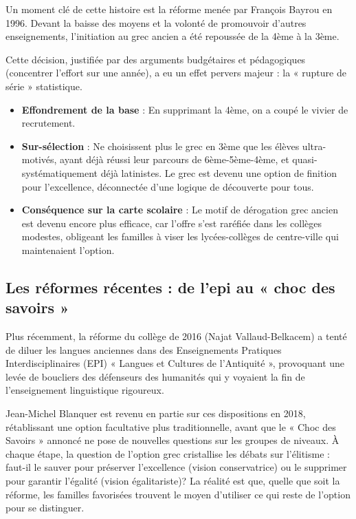 Un moment clé de cette histoire est la réforme menée par François Bayrou en 1996. Devant la baisse
des moyens et la volonté de promouvoir d'autres enseignements, l'initiation au grec ancien a été
repoussée de la 4ème à la 3ème.\cite{I-3-1-ref40}

Cette décision, justifiée par des arguments budgétaires et pédagogiques (concentrer l'effort sur une
année), a eu un effet pervers majeur : la « rupture de série » statistique.

\begin{itemize}\item \textbf{Effondrement de la base} : En supprimant la 4ème, on a coupé le vivier de recrutement.\item \textbf{Sur-sélection} : Ne choisissent plus le grec en 3ème que les élèves ultra-motivés, ayant déjà réussi leur parcours de 6ème-5ème-4ème, et quasi-systématiquement déjà latinistes. Le grec est devenu une option de finition pour l'excellence, déconnectée d'une logique de découverte pour tous.\item \textbf{Conséquence sur la carte scolaire} : Le motif de dérogation \og grec ancien\fg{} est devenu encore plus efficace, car l'offre s'est raréfiée dans les collèges modestes, obligeant les familles à viser les lycées-collèges de centre-ville qui maintenaient l'option.\cite{I-3-1-ref40}\end{itemize}

\subsection{Les réformes récentes : de l'epi au « choc des savoirs »}

Plus récemment, la réforme du collège de 2016 (Najat Vallaud-Belkacem) a tenté de diluer les langues
anciennes dans des Enseignements Pratiques Interdisciplinaires (EPI) « Langues et Cultures de
l'Antiquité », provoquant une levée de boucliers des défenseurs des humanités qui y voyaient la fin
de l'enseignement linguistique rigoureux.\cite{I-3-1-ref45}

Jean-Michel Blanquer est revenu en partie sur ces dispositions en 2018, rétablissant une option
facultative plus traditionnelle, avant que le « Choc des Savoirs » annoncé ne pose de nouvelles
questions sur les groupes de niveaux.\cite{I-3-1-ref1} À chaque étape, la question de l'option grec
cristallise les débats sur l'élitisme : faut-il le sauver pour préserver l'excellence (vision
conservatrice) ou le supprimer pour garantir l'égalité (vision égalitariste)? La réalité est que,
quelle que soit la réforme, les familles favorisées trouvent le moyen d'utiliser ce qui reste de
l'option pour se distinguer.



